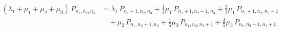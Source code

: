 \[
\begin{aligned}
  (\lambda_{1} + \mu_{1} + \mu_{2} + \mu_{3})\,P_{n_{1},n_{2},n_{3}} &= \lambda_{1}\,P_{n_{1}-1,n_{2},n_{3}} + \tfrac{1}{3}\mu_{1}\,P_{n_{1}+1,n_{2}-1,n_{3}} + \tfrac{2}{3}\mu_{1}\,P_{n_{1}+1,n_{2},n_{3}-1}\\
  &\quad + \mu_{2}\,P_{n_{1},n_{2}+1,n_{3}} + \tfrac{1}{5}\mu_{3}\,P_{n_{1},n_{2},n_{3}+1} + \tfrac{4}{5}\mu_{3}\,P_{n_{1},n_{2}-1,n_{3}+1}
\end{aligned}
\]
